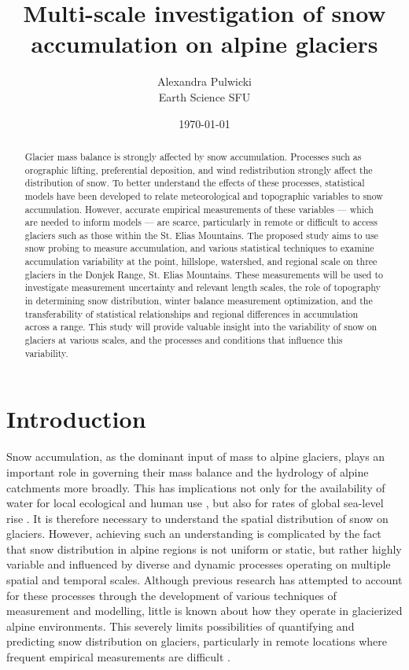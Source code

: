 \documentclass[12pt]{article}
\begin{document}
\title{Multi-scale investigation of snow accumulation on alpine glaciers}
\author{Alexandra Pulwicki \\ Earth Science SFU}
\date{\today}
\maketitle


\begin{abstract}
Glacier mass balance is strongly affected by snow accumulation. Processes such as orographic lifting, preferential deposition, and wind redistribution strongly affect the distribution of snow. To better understand the effects of these processes, statistical models have been developed to relate meteorological and topographic variables to snow accumulation. However, accurate empirical measurements of these variables --- which are needed to inform models --- are scarce, particularly in remote or difficult to access glaciers such as those within the St. Elias Mountains. The proposed study aims to use snow probing to measure accumulation, and various statistical techniques to examine accumulation variability at the point, hillslope, watershed, and regional scale on three glaciers in the Donjek Range, St. Elias Mountains. These measurements will be used to investigate measurement uncertainty and relevant length scales, the role of topography in determining snow distribution, winter balance measurement optimization, and the transferability of statistical relationships and regional differences in accumulation across a range. This study will provide valuable insight into the variability of snow on glaciers at various scales, and the processes and conditions that influence this variability.
 \end{abstract}
 
\pagebreak
\tableofcontents
\pagebreak

\section{Introduction}

Snow accumulation, as the dominant input of mass to alpine glaciers, plays an important role in governing their mass balance and the hydrology of alpine catchments more broadly. This has implications not only for the availability of water for local ecological and human use \citep{Barnett2005,ONeel2014}, but also for rates of global sea-level rise \citep{Gardner2013}. It is therefore necessary to understand the spatial distribution of snow on glaciers. However, achieving such an understanding is complicated by the fact that snow distribution in alpine regions is not uniform or static, but rather highly variable and influenced by diverse and dynamic processes operating on multiple spatial and temporal scales. Although previous research has attempted to account for these processes through the development of various techniques of measurement and modelling, little is known about how they operate in glacierized alpine environments. This severely limits possibilities of quantifying and predicting snow distribution on glaciers, particularly in remote locations where frequent empirical measurements are difficult \citep{Nolan2015}.
\end{document}

